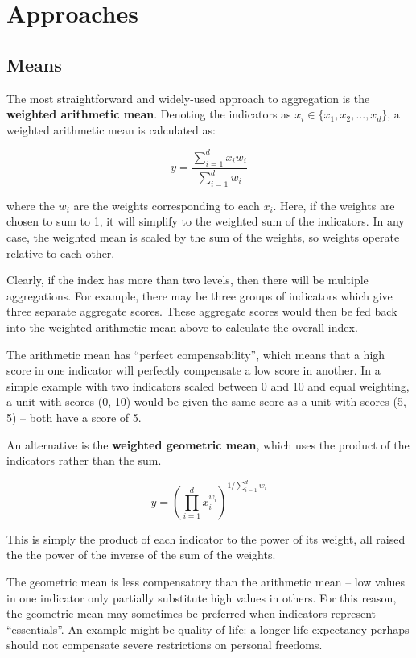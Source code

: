 \documentclass[
]{book}
\begin{document}
\hypertarget{approaches-1}{%
\section{Approaches}\label{approaches-1}}

\hypertarget{means}{%
\subsection{Means}\label{means}}

The most straightforward and widely-used approach to aggregation is the \textbf{weighted arithmetic mean}. Denoting the indicators as \(x_i \in \{x_1, x_2, ... , x_d \}\), a weighted arithmetic mean is calculated as:

\[ y = \frac{\sum_{i=1}^d x_iw_i}{\sum_{i=1}^d w_i}  \]

where the \(w_i\) are the weights corresponding to each \(x_i\). Here, if the weights are chosen to sum to 1, it will simplify to the weighted sum of the indicators. In any case, the weighted mean is scaled by the sum of the weights, so weights operate relative to each other.

Clearly, if the index has more than two levels, then there will be multiple aggregations. For example, there may be three groups of indicators which give three separate aggregate scores. These aggregate scores would then be fed back into the weighted arithmetic mean above to calculate the overall index.

The arithmetic mean has ``perfect compensability'', which means that a high score in one indicator will perfectly compensate a low score in another. In a simple example with two indicators scaled between 0 and 10 and equal weighting, a unit with scores (0, 10) would be given the same score as a unit with scores (5, 5) -- both have a score of 5.

An alternative is the \textbf{weighted geometric mean}, which uses the product of the indicators rather than the sum.

\[ y = \left( \prod_{i=1}^d x_i^{w_i} \right)^{1 / \sum_{i=1}^d w_i} \]

This is simply the product of each indicator to the power of its weight, all raised the the power of the inverse of the sum of the weights.

The geometric mean is less compensatory than the arithmetic mean -- low values in one indicator only partially substitute high values in others. For this reason, the geometric mean may sometimes be preferred when indicators represent ``essentials''. An example might be quality of life: a longer life expectancy perhaps should not compensate severe restrictions on personal freedoms.
\end{document}
